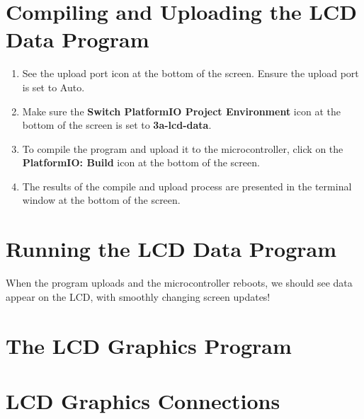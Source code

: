 \documentclass{article}
\begin{document}
\section*{Compiling and Uploading the LCD Data Program}
\vspace{3mm}
\begin{enumerate}
    \item See the upload port icon at the bottom of the screen. Ensure the 
    upload port is set to Auto. 
    \vspace{3mm}

    \item Make sure the \textbf{Switch PlatformIO Project Environment} icon 
    at the bottom of the screen is set to \textbf{3a-lcd-data}.  
    \vspace{3mm}

    \item To compile the program and upload it to the microcontroller, click 
    on the \textbf{PlatformIO: Build} icon at the bottom of the screen.
    \vspace{3mm}

    \item The results of the compile and upload process are presented in the 
    terminal window at the bottom of the screen.
    \vspace{3mm}

\end{enumerate}
\vspace{3mm}

\section*{Running the LCD Data Program}

When the program uploads and the microcontroller reboots, we should see data 
appear on the LCD, with smoothly changing screen updates!
\newpage

\section*{The LCD Graphics Program}
\vspace{3mm}

\section*{LCD Graphics Connections}
\vspace{3mm}
\end{document}
